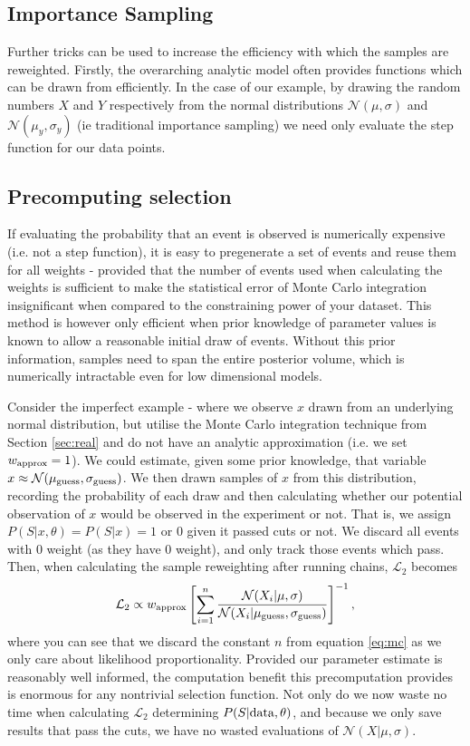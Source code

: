 \documentclass[a4paper,fleqn,usenatbib]{mnras}
\begin{document}
\subsection{Importance Sampling}
Further tricks can be used to increase the efficiency with which the samples are reweighted. Firstly, the overarching analytic model often provides functions which can be drawn from efficiently. In the case of our example, by drawing the random numbers $X$ and $Y$ respectively from the normal distributions $\mathcal{N}(\mu,\sigma)$ and $\mathcal{N}(\mu_y,\sigma_y)$ (ie traditional importance sampling) we need only evaluate the step function for our data points.

\subsection{Precomputing selection}
If evaluating the probability that an event is observed is numerically expensive (i.e. not a step function), it is easy to pregenerate a set of events and reuse them for all weights - provided that the number of events used when calculating the weights is sufficient to make the statistical error of Monte Carlo integration insignificant when compared to the constraining power of your dataset. This method is however only efficient when prior knowledge of parameter values is known to allow a reasonable initial draw of events. Without this prior information, samples need to span the entire posterior volume, which is numerically intractable even for low dimensional models. 

Consider the imperfect example - where we observe $x$ drawn from an underlying normal distribution, but utilise the Monte Carlo integration technique from Section \ref{sec:real} and do not have an analytic approximation (i.e. we set $w_{\rm approx} =1$). We could estimate, given some prior knowledge, that variable $x \approx \mathcal{N}(\mu_{\rm guess}, \sigma_{\rm guess})$. We then drawn samples of $x$ from this distribution, recording the probability of each draw and then calculating whether our potential observation of $x$ would be observed in the experiment or not. That is, we assign $P(S|x,\theta) = P(S|x) = 1$ or $0$ given it passed cuts or not. We discard all events with $0$ weight (as they have $0$ weight), and only track those events which pass. Then, when calculating the sample reweighting after running chains, $\mathcal{L}_2$ becomes
\begin{align}
\mathcal{L}_2 \propto w_{\rm approx}  \left[\sum_{i=1}^{n} \frac{\mathcal{N}(X_i | \mu, \sigma)}{\mathcal{N}(X_i | \mu_{\rm guess}, \sigma_{\rm guess})} \right]^{-1},
\end{align} 
where you can see that we discard the constant $n$ from equation \eqref{eq:mc} as we only care about likelihood proportionality. Provided our parameter estimate is reasonably well informed, the computation benefit this precomputation provides is enormous for any nontrivial selection function. Not only do we now waste no time when calculating $\mathcal{L}_2$ determining $P(S|{\rm data}, \theta)$, and because we only save results that pass the cuts, we have no wasted evaluations of $\mathcal{N}(X | \mu, \sigma)$.
\end{document}

